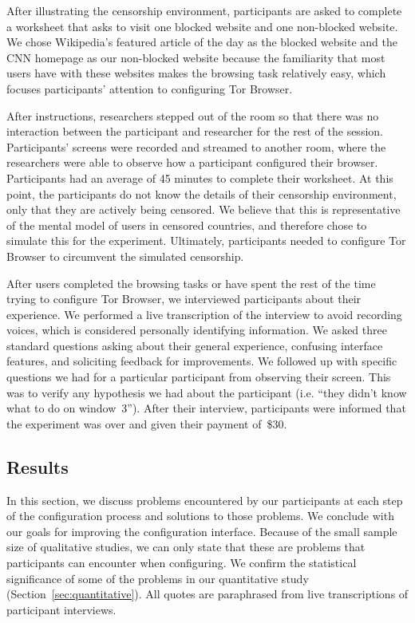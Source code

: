 \documentclass[USenglish,oneside,twocolumn]{article}
\begin{document}
After illustrating the censorship environment, participants are asked to 
complete a worksheet that asks to visit one blocked website and one non-blocked website. 
We chose Wikipedia's featured article of the day as the blocked website and 
the CNN homepage as our non-blocked website because the familiarity 
that most users have with these websites makes the browsing task relatively easy, 
which focuses participants' attention to configuring Tor Browser. 

After instructions, researchers stepped out of the room so that there was no interaction
between the participant and researcher for the rest of the session. Participants' screens 
were recorded and streamed to another room, where the researchers were able to 
observe how a participant configured their browser. Participants had an 
average of 45 minutes to complete their worksheet. 
At this point, the participants do not know the details of their censorship environment,
only that they are actively being censored. We believe that this is representative 
of the mental model of users in censored countries, and therefore chose to simulate 
this for the experiment. Ultimately, participants needed to configure Tor Browser to 
circumvent the simulated censorship. 

After users completed the browsing tasks or have spent the rest of the time
trying to configure Tor Browser, we interviewed participants about their experience.
We performed a live transcription of the interview to avoid recording voices, which is
considered personally identifying information. 
We asked three standard questions asking about their general experience, 
confusing interface features, and soliciting feedback for improvements. We followed up
with specific questions we had for a particular participant from observing their screen. 
This was to verify any hypothesis we had about the participant (i.e. ``they didn't know what to do on window~3'').  
After their interview, participants were informed that the experiment was over and 
given their payment of~\$30. 

\subsection{Results} 
In this section, we discuss problems encountered by our participants at each step of the configuration process and solutions to those problems. We conclude with our goals for improving the configuration interface. Because of the small sample size of qualitative studies, we can only state that these are problems that participants can encounter when configuring. We confirm the statistical significance of some of the problems in our quantitative study (Section~\ref{sec:quantitative}). All quotes are paraphrased from live transcriptions of participant interviews.\\
\end{document}
